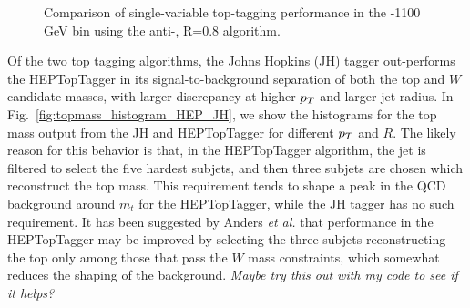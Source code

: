\begin{figure}
\begin{center}
\caption{Comparison of single-variable top-tagging performance in the -1100 GeV bin using the anti-\kT, R=0.8 algorithm.}
\label{fig:single_variable_ROC}
\end{center}
\end{figure}

Of the two top tagging algorithms, the Johns Hopkins (JH) tagger out-performs the HEPTopTagger in its signal-to-background separation of both the top and $W$ candidate masses, with larger discrepancy at higher $p_T$ and larger jet radius. In Fig.~\ref{fig:topmass_histogram_HEP_JH}, we show the histograms for the top mass output from the JH and HEPTopTagger for different $p_T$ and $R$. The likely reason for this behavior is that, in the HEPTopTagger algorithm, the jet is filtered to select the five hardest subjets, and then three subjets are chosen which reconstruct the top mass. This requirement tends to shape a peak in the QCD background around $m_t$ for the HEPTopTagger, while the JH tagger has no such requirement. It has been suggested by Anders \emph{et al.} \cite{Anders:2013oga} that performance in the HEPTopTagger may be improved by selecting the three subjets reconstructing the top only among those that pass the $W$ mass constraints, which somewhat reduces the shaping of the background. \emph{Maybe try this out with my code to see if it helps?}

